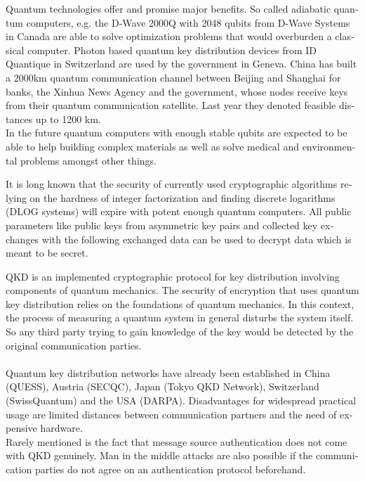 \documentclass[a4paper,11pt]{article}
\begin{document}
\begin{otherlanguage}{english}
\begin{multicols}{2}
Quantum technologies offer and promise major benefits. So called adiabatic quantum computers, e.g. the D-Wave 2000Q with 2048 qubits from D-Wave Systems in Canada are able to solve optimization problems that would overburden a classical computer. Photon based quantum key distribution devices from ID Quantique in Switzerland are used by the government in Geneva. China has built a 2000km quantum communication channel between Beijing and Shanghai for banks, the Xinhua News Agency and the government, whose nodes receive keys from their quantum communication satellite. Last year they denoted feasible distances up to 1200 km. \\
In the future quantum computers with enough stable qubits are expected to be able to help building complex materials as well as solve medical and environmental problems amongst other things.

It is long known that the security of currently used cryptographic algorithms relying on the hardness of integer factorization and finding discrete logarithms (DLOG systems) \cite{SHO} will expire with potent enough quantum computers. All public parameters like public keys from asymmetric key pairs and collected key exchanges with the following exchanged data can be used to decrypt data which is meant to be secret. \\


QKD is an implemented cryptographic protocol for key distribution involving components of quantum mechanics. The security of encryption that uses quantum key distribution relies on the foundations of quantum mechanics. In this context, the process of measuring a quantum system in general disturbs the system itself. So any third party trying to gain knowledge of the key would be detected by the original communication parties. \\ 
\\
Quantum key distribution networks have already been established in China (QUESS), Austria (SECQC), Japan (Tokyo QKD Network), Switzerland (SwissQuantum) and the USA (DARPA). 
Disadvantages for widespread practical usage are limited distances between communication partners and the need of expensive hardware. \\
Rarely mentioned is the fact that message source authentication does not come with QKD genuinely. Man in the middle attacks are also possible if the communication parties do not agree on an authentication protocol beforehand.  


\end{multicols}
\end{otherlanguage}
\end{document}
